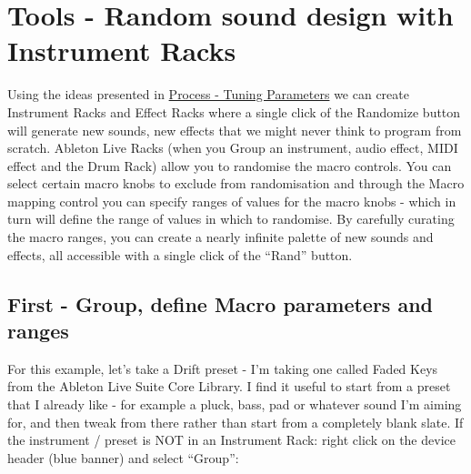 \documentclass[
  12pt,
  letterpaper,
  oneside,
  open=any]{scrbook}
\begin{document}

\chapter{Tools - Random sound design with Instrument
Racks}\label{Chapter-024-Tools-Random_Sound_Design}

\begin{tcolorbox}[enhanced jigsaw, breakable, left=2mm, leftrule=.75mm, toprule=.15mm, opacitybacktitle=0.6, toptitle=1mm, coltitle=black, colback=white, colbacktitle=quarto-callout-tip-color!10!white, opacityback=0, rightrule=.15mm, bottomrule=.15mm, titlerule=0mm, title=\textcolor{quarto-callout-tip-color}{\faLightbulb}\hspace{0.5em}{Key idea}, arc=.35mm, bottomtitle=1mm, colframe=quarto-callout-tip-color-frame]

Using the ideas presented in
\hyperref[Chapter-009-Process-Tuning_Parameters]{Process - Tuning
Parameters} we can create Instrument Racks and Effect Racks where a
single click of the Randomize button will generate new sounds, new
effects that we might never think to program from scratch. Ableton Live
Racks (when you Group an instrument, audio effect, MIDI effect and the
Drum Rack) allow you to randomise the macro controls. You can select
certain macro knobs to exclude from randomisation and through the Macro
mapping control you can specify ranges of values for the macro knobs -
which in turn will define the range of values in which to randomise. By
carefully curating the macro ranges, you can create a nearly infinite
palette of new sounds and effects, all accessible with a single click of
the ``Rand'' button.

\end{tcolorbox}

\section{First - Group, define Macro parameters and
ranges}\label{first---group-define-macro-parameters-and-ranges}

For this example, let's take a Drift preset - I'm taking one called
Faded Keys from the Ableton Live Suite Core Library. I find it useful to
start from a preset that I already like - for example a pluck, bass, pad
or whatever sound I'm aiming for, and then tweak from there rather than
start from a completely blank slate. If the instrument / preset is NOT
in an Instrument Rack: right click on the device header (blue banner)
and select ``Group'':
\end{document}
